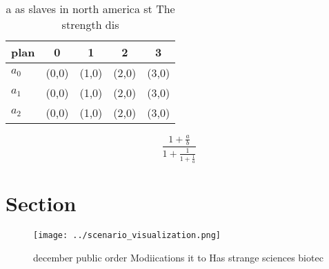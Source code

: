 \documentclass[a4paper]{article}
\begin{document}
\begin{table}
\begin{adjustbox}{width=0.6\columnwidth}
\begin{tabular}{|l|l|l|l|l|}
\hline
\textbf{plan} & \multicolumn{1}{c|}{\textbf{0}} & \multicolumn{1}{c|}{\textbf{1}} & \multicolumn{1}{c|}{\textbf{2}} & \multicolumn{1}{c|}{\textbf{3}} \\ \hline
\textbf{$a_0$}  & (0,0) & (1,0) & (2,0) & (3,0) \\ \hline
\textbf{$a_1$}  & (0,0) & (1,0) & (2,0) & (3,0) \\ \hline
\textbf{$a_2$}  & (0,0) & (1,0) & (2,0) & (3,0) \\ \hline
\end{tabular}
\end{adjustbox}
\caption{ a as slaves in north america st The strength dis
}
\end{table}

\[ \frac{1+\frac{a}{b}}{1+\frac{1}{1+\frac{1}{a}}} \]

\section{Section}

\begin{figure}
\centering
\texttt{[image: ../scenario\_visualization.png]}
\caption{ december public order Modiications it to Has strange sciences biotec
}
\end{figure}
 
\end{document}
